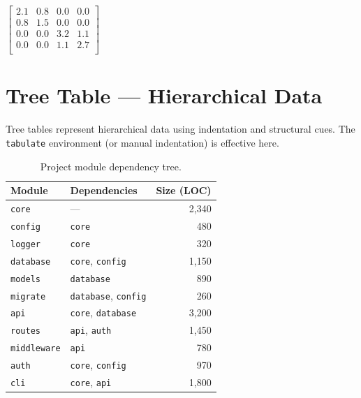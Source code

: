 \documentclass[
    language=english,
    doctype=article,
    institution=none,
]{../../omnilatex}
\begin{document}
\begin{table}[htbp]
    \centering
    \caption{Block-diagonal covariance structure ($p = 4$).}
    \label{tab:block-matrix}
    \renewcommand{\arraystretch}{1.4}
    $\left[\begin{array}{cc|cc}
        2.1 & 0.8 & 0.0 & 0.0 \\
        0.8 & 1.5 & 0.0 & 0.0 \\
        \hline
        0.0 & 0.0 & 3.2 & 1.1 \\
        0.0 & 0.0 & 1.1 & 2.7 \\
    \end{array}\right]$
\end{table}

\section{Tree Table — Hierarchical Data}
\label{sec:tree}

Tree tables represent hierarchical data using indentation and structural cues.
The \texttt{tabulate} environment (or manual indentation) is effective here.

\begin{table}[htbp]
    \centering
    \caption{Project module dependency tree.}
    \label{tab:tree}
    \renewcommand{\arraystretch}{1.35}
    \begin{tabular}{l l r}
        \toprule
        \textbf{Module} & \textbf{Dependencies} & \textbf{Size (LOC)} \\
        \midrule
        \texttt{core}              & ---                   & 2,340 \\
        \quad \texttt{config}      & \texttt{core}         &   480 \\
        \quad \texttt{logger}      & \texttt{core}         &   320 \\
        \quad \texttt{database}    & \texttt{core}, \texttt{config} & 1,150 \\
        \quad\quad \texttt{models} & \texttt{database}     &   890 \\
        \quad\quad \texttt{migrate}& \texttt{database}, \texttt{config} & 260 \\
        \texttt{api}               & \texttt{core}, \texttt{database} & 3,200 \\
        \quad \texttt{routes}      & \texttt{api}, \texttt{auth} & 1,450 \\
        \quad \texttt{middleware}  & \texttt{api}          &   780 \\
        \quad \texttt{auth}        & \texttt{core}, \texttt{config} & 970 \\
        \texttt{cli}               & \texttt{core}, \texttt{api} & 1,800 \\
        \bottomrule
    \end{tabular}
\end{table}
\end{document}
